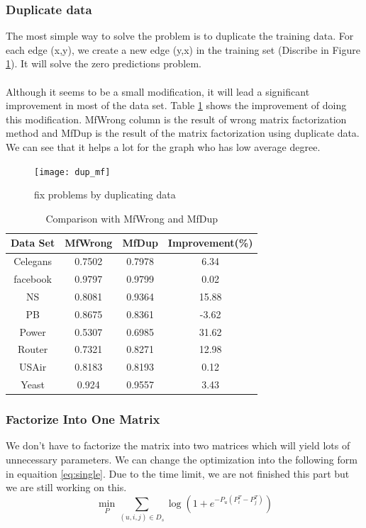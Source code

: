 \documentclass[12pt]{article}
\begin{document}
\subsubsection{Duplicate data}
The most simple way to solve the problem is to duplicate the training data. For each edge (x,y), we create a new edge (y,x) in the training set (Discribe in Figure \ref{fig:dup_mf}). It will solve the zero predictions problem. 
\\ \\
Although it seems to be a small modification, it will lead a significant improvement in most of the data set.
Table \ref{tab:dup} shows the improvement of doing this modification. MfWrong column is the result of wrong matrix factorization method and MfDup is the result of the matrix factorization using duplicate data. We can see that it helps a lot for the graph who has low average degree. 


\begin{figure}[h]
	\centering
	\texttt{[image: dup\_mf]}
	\caption{fix problems by duplicating data}
	\label{fig:dup_mf}
\end{figure}

\begin{table}
	\begin{center}
		\begin{tabular}{|c|c|c|c|}
			\hline
			Data Set & MfWrong & MfDup & Improvement(\%) \\
			\hline
			Celegans&0.7502&0.7978&6.34\\
			facebook&0.9797&0.9799&0.02\\
			NS&0.8081&0.9364&15.88\\
			PB&0.8675&0.8361&-3.62\\
			Power&0.5307&0.6985&31.62\\
			Router&0.7321&0.8271&12.98\\
			USAir&0.8183&0.8193&0.12\\
			Yeast&0.924&0.9557&3.43\\
			\hline
		\end{tabular}
	\end{center}
	\caption{Comparison with MfWrong and MfDup}
	\label{tab:dup}
\end{table}

\subsubsection{Factorize Into One Matrix}
We don't have to factorize the matrix into two matrices which will yield lots of unnecessary parameters. We can change the optimization into the following form in equaition \ref{eq:single}. Due to the time limit, we are not finished this part but we are still working on this.
\begin{equation}
\min_{P} \sum_{(u,i,j)\in D_s}\log(1+e^{-P_u(P_i^T - P_j^T)})
\label{eq:single}
\end{equation}
\end{document}
